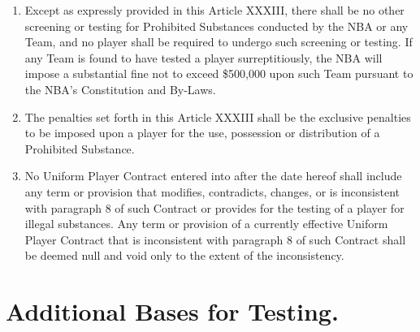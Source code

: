 \documentclass[
]{book}
\providecommand{\tightlist}{%
  \setlength{\itemsep}{0pt}\setlength{\parskip}{0pt}}
\begin{document}
\begin{enumerate}
\def\labelenumi{(\alph{enumi})}
\tightlist
\item
  Except as expressly provided in this Article XXXIII, there shall be no other screening or testing for Prohibited Substances conducted by the NBA or any Team, and no player shall be required to undergo such screening or testing. If any Team is found to have tested a player surreptitiously, the NBA will impose a substantial fine not to exceed \$500,000 upon such Team pursuant to the NBA's Constitution and By-Laws.
\item
  The penalties set forth in this Article XXXIII shall be the exclusive penalties to be imposed upon a player for the use, possession or distribution of a Prohibited Substance.
\item
  No Uniform Player Contract entered into after the date hereof shall include any term or provision that modifies, contradicts, changes, or is inconsistent with paragraph 8 of such Contract or provides for the testing of a player for illegal substances. Any term or provision of a currently effective Uniform Player Contract that is inconsistent with paragraph 8 of such Contract shall be deemed null and void only to the extent of the inconsistency.
\end{enumerate}

\hypertarget{additional-bases-for-testing.}{%
\section{Additional Bases for Testing.}\label{additional-bases-for-testing.}}
\end{document}
